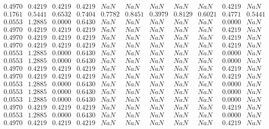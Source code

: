 \documentclass[14pt,final,oneside]{extreport}%
\begin{document}
    \begin{small}
        ~
        \[\begin{array}{llllllllllllllll}
              0.4970 & 0.4219 & 0.4219 & 0.4219 & NaN    & NaN    & NaN    & NaN    & NaN    & 0.4219 & NaN    \\
              0.1761 & 0.5441 & 0.6532 & 0.7404 & 0.7782 & 0.8451 & 0.3979 & 0.8129 & 0.6021 & 0.4771 & 0.5441 \\
              0.0553 & 1.2885 & 0.0000 & 0.6430 & NaN    & NaN    & NaN    & NaN    & NaN    & 0.0000 & NaN    \\
              0.4970 & 0.4219 & 0.4219 & 0.4219 & NaN    & NaN    & NaN    & NaN    & NaN    & 0.4219 & NaN    \\
              0.4970 & 0.4219 & 0.4219 & 0.4219 & NaN    & NaN    & NaN    & NaN    & NaN    & 0.4219 & NaN    \\
              0.4970 & 0.4219 & 0.4219 & 0.4219 & NaN    & NaN    & NaN    & NaN    & NaN    & 0.4219 & NaN    \\
              0.0553 & 1.2885 & 0.0000 & 0.6430 & NaN    & NaN    & NaN    & NaN    & NaN    & 0.0000 & NaN    \\
              0.0553 & 1.2885 & 0.0000 & 0.6430 & NaN    & NaN    & NaN    & NaN    & NaN    & 0.0000 & NaN    \\
              0.4970 & 0.4219 & 0.4219 & 0.4219 & NaN    & NaN    & NaN    & NaN    & NaN    & 0.4219 & NaN    \\
              0.4970 & 0.4219 & 0.4219 & 0.4219 & NaN    & NaN    & NaN    & NaN    & NaN    & 0.4219 & NaN    \\
              0.0553 & 1.2885 & 0.0000 & 0.6430 & NaN    & NaN    & NaN    & NaN    & NaN    & 0.0000 & NaN    \\
              0.0553 & 1.2885 & 0.0000 & 0.6430 & NaN    & NaN    & NaN    & NaN    & NaN    & 0.0000 & NaN    \\
              0.0553 & 1.2885 & 0.0000 & 0.6430 & NaN    & NaN    & NaN    & NaN    & NaN    & 0.0000 & NaN    \\
              0.4970 & 0.4219 & 0.4219 & 0.4219 & NaN    & NaN    & NaN    & NaN    & NaN    & 0.4219 & NaN    \\
              0.0553 & 1.2885 & 0.0000 & 0.6430 & NaN    & NaN    & NaN    & NaN    & NaN    & 0.0000 & NaN    \\
              0.4970 & 0.4219 & 0.4219 & 0.4219 & NaN    & NaN    & NaN    & NaN    & NaN    & 0.4219 & NaN
        \end{array}\]
    \end{small}
\end{document}
